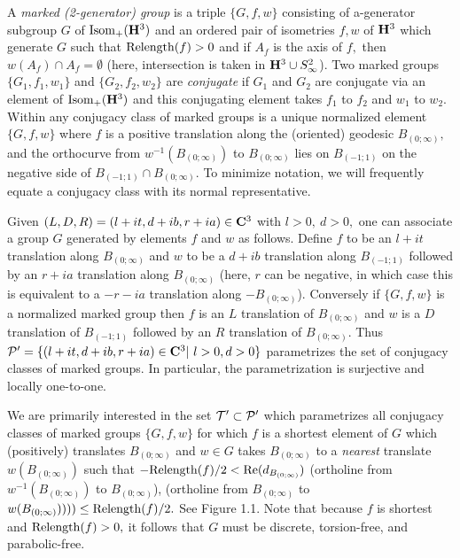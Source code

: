 A {\it marked {\rm (2-}generator\/{\rm )} group} is a triple $\{G,f,w\}$ consisting of a-generator subgroup $G$ of ${\rm Isom}_+({\bf H}^3)$
and an ordered pair of isometries $f,w$ of ${\bf H}^3$ which generate $G$  such that ${\rm Relength}(f) > 0$ and if $A_f$ is the axis of $f,$ then $w(A_f)
\cap A_f  = \emptyset$  (here, intersection is taken in ${\bf H}^3 \cup S^2_\infty$). Two marked groups $\{G_1,f_1,w_1\}$ and $\{G_2,f_2,w_2\}$
are {\it conjugate} if $G_1$ and $G_2$ are conjugate via an element of ${\rm Isom}_+({\bf H}^3)$ and this conjugating element takes $f_1$ to $f_2$
and
$w_1$ to $w_2.$  Within any conjugacy class of marked groups is a unique normalized element
$\{G,f,w\}$ where $f$ is a
positive translation  along the (oriented) geodesic $B_{(0;\infty)},$  and the
orthocurve from $w^{-1}(B_{(0;\infty)})$ to $B_{(0;\infty)}$ lies on 
$ B_{(-1;1)}$
on the negative side of $ B_{(-1;1)}\cap B_{(0;\infty)}.$  
To minimize notation, we will frequently equate a conjugacy class with its normal representative.
\enddemo

Given $(L,D,R)=(l+it, d+ib, r+ia)\in{\bf C}^3$ with $l > 0,\ d > 0,$ one  can associate a group $G$ generated by  elements $f$ and $w$ as follows.  Define $f$ to be an $l+it$ translation along $B_{(0;\infty)}$ and $w$ to be a $d+ib$ translation along $ B_{(-1;1)}$ followed by an $r+ia$ translation along $B_{(0;\infty)}$ (here, $r$ can be negative, in which case this is equivalent to
a
$-r-ia$ translation along $-B_{(0;\infty)}$).  Conversely if $\{G,f,w\}$ is a normalized marked group then $f$ is an $L$ translation of $B_{(0;\infty)}$
and $w$ is a $D$ translation of 
$ B_{(-1;1)}$ followed by an $R$ translation of $B_{(0;\infty)}.$ Thus
${\cal P}^\prime = \{(l+it,d+ib,r+ia)\in {\bf C}^3 | \ l>0, d>0\}$ 
parametrizes the
set of conjugacy classes of marked groups.  In particular, the parametrization is surjective and locally one-to-one.

We are primarily interested in the set 
${\cal T}^{\prime}\subset {\cal P}^{\prime}$
which parametrizes all conjugacy classes of 
marked groups
$\{G,f,w\}$ for which $f$ is a shortest element  of $G$ which (positively) translates $B_{(0;\infty)}$ and $w\in G$ takes $ B_{(0;\infty)}$ to a
{\it nearest} translate $w(B_{(0;\infty)})$ such that 
$-{\rm Relength}(f)/2< {\rm Re}(d_ {B_{(0;\infty)}})$
(ortholine from $w^{-1}( B_{(0;\infty)})$ to $ B_{(0;\infty)}$),
(ortholine from $ B_{(0;\infty)}$ to $w(B_{(0;\infty)}))))
\le {\rm Relength}(f)/2.$  
See Figure 1.1.
Note that because $f$ is shortest and
$\Relength(f)\break > 0,$ it follows that $G$ must be 
discrete, torsion-free, and parabolic-free.
 


